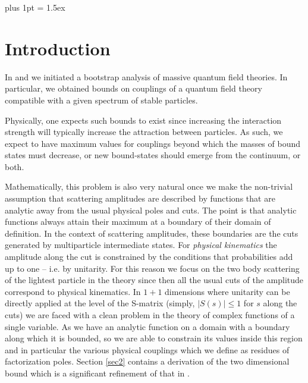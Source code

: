 \documentclass[12pt]{article}
\newcommand{\<}{{\langle}}
\renewcommand{\>}{{\rangle}}
\begin{document}
\setcounter{page}{1}
\renewcommand{\thefootnote}{\arabic{footnote}}
\setcounter{footnote}{0}

\setcounter{tocdepth}{2}


 \def\nref#1{{(\ref{#1})}}

\newpage

\tableofcontents

\parskip 5pt plus 1pt   \jot = 1.5ex

\newpage
\section{Introduction} 
In \cite{paperI} and \cite{paperII} we initiated a bootstrap analysis of massive quantum field theories. In particular, we obtained bounds on couplings of a  quantum field theory compatible with a given spectrum of stable particles. 

Physically, one expects such bounds to exist since increasing the interaction strength will typically increase the attraction between particles. As such, we expect to have maximum values for couplings beyond which the masses of bound states must decrease, or new bound-states should emerge from the continuum, or both.  

Mathematically, this problem is also very natural once we make the non-trivial assumption that scattering amplitudes are described by functions that are analytic away from the usual physical poles and cuts. The point is that analytic functions always attain their maximum at a boundary of their domain of definition.  In the context of scattering amplitudes, these boundaries are the cuts generated by multiparticle intermediate states. For \textit{physical kinematics} the amplitude along the cut is constrained by the conditions that probabilities add up to one -- i.e. by unitarity.  For this reason we focus on the two body scattering of the lightest particle in the theory since then all the usual cuts of the amplitude correspond to physical kinematics. In $1+1$ dimensions where unitarity can be directly applied at the level of the S-matrix (simply, $|S(s)|\le1$ for $s$ along the cuts) we are faced with a clean problem in the theory of complex functions of a single variable. As we have an analytic function on a domain with a boundary along which it is bounded, so we are able to constrain its values inside this region and in particular the various physical couplings which we define as residues of factorization poles. {Section \ref{sec2} contains a derivation of the two dimensional bound which is a significant refinement of that in \cite{paperII}.}
\end{document}
